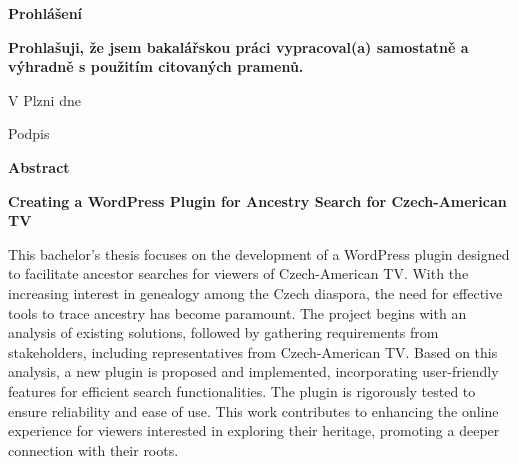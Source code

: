 \documentclass[12pt]{report}
\begin{document}
\begin{center}
    \textbf{\Huge Prohlášení} %
\end{center}

\mbox{}
\vfill  %

\begin{minipage}{0.8\textwidth} %
    \textbf{Prohlašuji, že jsem bakalářskou práci vypracoval(a) samostatně a výhradně s použitím citovaných pramenů.}

   \vspace{0.5cm} %

   V Plzni dne \underline{\hspace{5cm}} %

    \vspace{0.5cm} %

    Podpis  \underline{\hspace{5cm}}  %
\end{minipage}

\newpage 
\begin{center}
    \textbf{\Huge Abstract} %
\end{center}

\vspace{1cm}

\begin{center}
    \textbf{\LARGE Creating a WordPress Plugin for Ancestry Search for Czech-American TV}
\end{center}

\vspace{1cm}  %
This bachelor’s thesis focuses on the development of a WordPress plugin designed to facilitate ancestor searches for viewers of Czech-American TV. With the increasing interest in genealogy among the Czech diaspora, the need for effective tools to trace ancestry has become paramount. The project begins with an analysis of existing solutions, followed by gathering requirements from stakeholders, including representatives from Czech-American TV. Based on this analysis, a new plugin is proposed and implemented, incorporating user-friendly features for efficient search functionalities. The plugin is rigorously tested to ensure reliability and ease of use. This work contributes to enhancing the online experience for viewers interested in exploring their heritage, promoting a deeper connection with their roots.
\end{document}
